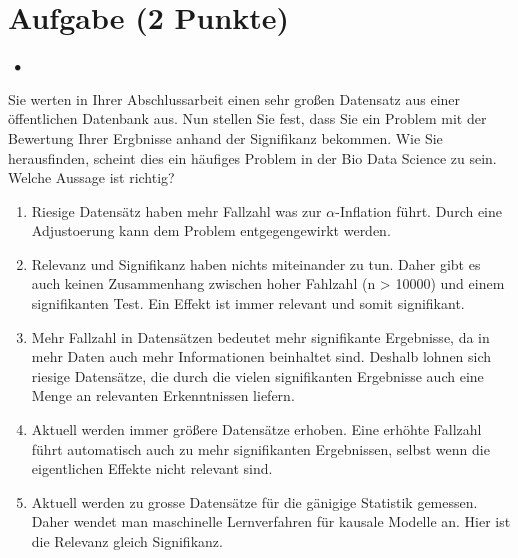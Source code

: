 \documentclass[a4paper, 9pt]{scrartcl}\usepackage[]{graphicx}\usepackage[]{xcolor}
\begin{document}
\section{Aufgabe \hfill (2 Punkte)}

\ifcollection
\begin{flushright}
\tiny\vspace{-2Ex}
\textbf{\examinhaltstart}
\exammodulestatversuch $\;\bullet$
\exammodulebiostat
\vspace{-1Ex}
\end{flushright}
\fi




Sie werten in Ihrer Abschlussarbeit einen sehr großen Datensatz aus einer öffentlichen Datenbank aus. Nun stellen Sie fest, dass Sie ein Problem mit der Bewertung Ihrer Ergbnisse anhand der Signifikanz bekommen. Wie Sie herausfinden, scheint dies ein häufiges Problem in der Bio Data Science zu sein. Welche Aussage ist richtig?




\begin{enumerate}
\item [\textbf{A} \msquare] Riesige Datensätz haben mehr Fallzahl was zur $\alpha$-Inflation führt. Durch eine Adjustoerung kann dem Problem entgegengewirkt werden.
\item [\textbf{B} \msquare] Relevanz und Signifikanz haben nichts miteinander zu tun. Daher gibt es auch keinen Zusammenhang zwischen hoher Fahlzahl (n > 10000) und einem signifikanten Test. Ein Effekt ist immer relevant und somit signifikant.
\item [\textbf{C} \msquare] Mehr Fallzahl in Datensätzen bedeutet mehr signifikante Ergebnisse, da in mehr Daten auch mehr Informationen beinhaltet sind. Deshalb lohnen sich riesige Datensätze, die durch die vielen signifikanten Ergebnisse auch eine Menge an relevanten Erkenntnissen liefern.
\item [\textbf{D} \msquare] Aktuell werden immer größere Datensätze erhoben. Eine erhöhte Fallzahl führt automatisch auch zu mehr signifikanten Ergebnissen, selbst wenn die eigentlichen Effekte nicht relevant sind.
\item [\textbf{E} \msquare] Aktuell werden zu grosse Datensätze für die gänigige Statistik gemessen. Daher wendet man maschinelle Lernverfahren für kausale Modelle an. Hier ist die Relevanz gleich Signifikanz.
\end{enumerate}
\end{document}
